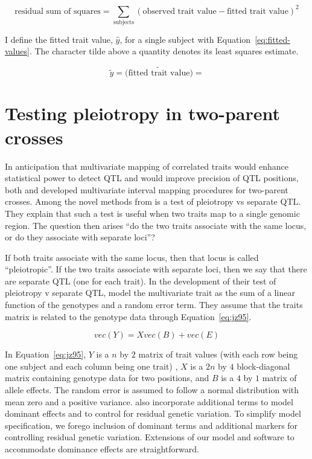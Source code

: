 \documentclass[oneside]{book}\usepackage[]{graphicx}\usepackage[]{color}
\begin{document}
\begin{equation}
\text{residual sum of squares} = \sum_{\text{subjects}}\left(\text{observed trait value} - \text{fitted trait value}\right)^2\label{eq:rss}
\end{equation}

I define the fitted trait value, $\hat y$, for a single subject with Equation~\ref{eq:fitted-values}. 
The character tilde above a quantity denotes its least squares estimate. 

\begin{equation}
\tilde y = \tilde{\text{(fitted trait value)}} = 
\label{eq:fitted-values}
\end{equation}



\section{Testing pleiotropy in two-parent crosses}\label{sec:pleiotropy-two-parent}

In anticipation that multivariate mapping of correlated traits would enhance statistical
power to detect QTL and would improve precision of QTL positions,
both \citet{jiang1995multiple} and \citet{korol1995interval} developed
multivariate interval mapping procedures for two-parent crosses. 
Among the novel methods from \citet{jiang1995multiple} is a test of pleiotropy vs separate QTL.
They explain that such a test is useful when two traits map to a single genomic region.
The question then arises ``do the two traits associate with the same locus, or do they associate with separate loci''?

If both traits associate with the same locus, then that locus is called ``pleiotropic''. If the two traits associate with separate loci, then we say that there are separate QTL (one for each trait). 
In the development of their test of pleiotropy v separate QTL, \citet{jiang1995multiple} model
the multivariate trait as the sum of a linear function of the genotypes and a random error term. They assume that the traits matrix is related to the genotype data through Equation~\ref{eq:jz95}.


\begin{equation}
vec(Y) = Xvec(B) + vec(E)\label{eq:jz95}
\end{equation}


In Equation~\ref{eq:jz95}, $Y$ is a $n$ by $2$ matrix of trait values (with each row being one subject and each column being one trait)
, $X$ is a $2n$ by $4$ block-diagonal matrix containing genotype data for two positions, and $B$ is a $4$ by $1$ matrix of allele effects.
The random error is assumed to follow a normal distribution with mean zero and a positive variance.
\citet{jiang1995multiple} also incorporate additional terms to model dominant effects and to
control for residual genetic variation.
To simplify model specification, we forego inclusion of dominant terms
and additional markers for controlling residual
genetic variation.
Extensions of our model and software to accommodate dominance effects are straightforward.
\end{document}
